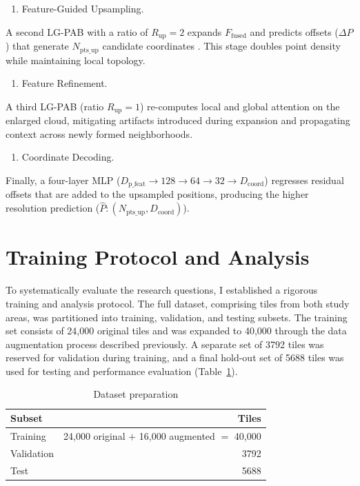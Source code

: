 \documentclass[12pt]{report}
\begin{document}
\begin{enumerate}
\item[(4)] {Feature-Guided Upsampling.}
\end{enumerate}

A second LG-PAB with a ratio of $R_{\text{up}}=2$ expands $F_{\text{fused}}$ and predicts offsets ($\Delta P$) that generate $N_{\text{pts\_up}}$ candidate coordinates
. This stage doubles point density while maintaining local topology.

\begin{enumerate}
\item[(5)] {Feature Refinement.}
\end{enumerate}

A third LG-PAB (ratio $R_{\text{up}}=1$) re-computes local and global attention on the enlarged cloud, mitigating artifacts introduced during expansion and propagating context across newly formed neighborhoods.

\begin{enumerate}
\item[(6)] {Coordinate Decoding.}
\end{enumerate}

Finally, a four-layer MLP ($D_{\text{p\_feat}} \rightarrow 128 \rightarrow 64 \rightarrow 32 \rightarrow D_{\text{coord}}$) regresses residual offsets that are added to the upsampled positions, producing the higher resolution prediction ($\hat{P}: (N_{\text{pts\_up}}, D_{\text{coord}})$).

\section{Training Protocol and Analysis}
\label{sec:study_design}
To systematically evaluate the research questions, I established a rigorous training and analysis protocol. The full dataset, comprising tiles from both study areas, was partitioned into training, validation, and testing subsets. The training set consists of 24,000 original tiles and was expanded to 40,000 through the data augmentation process described previously. A separate set of 3792 tiles was reserved for validation during training, and a final hold-out set of 5688 tiles was used for testing and performance evaluation \mbox{(Table \ref{tab:data_prep})}.
\begin{table}[htbp]
  \centering
  \caption{Dataset preparation}
  \label{tab:data_prep}
  \begin{tabular}{lr}
    \toprule
    \textbf{Subset} & \textbf{Tiles} \\
    \midrule
    Training        & 24,000 original $+$ 16,000 augmented $=$ 40,000 \\
    Validation      & 3792 \\
    Test            & 5688 \\
    \bottomrule
  \end{tabular}
\end{table}
\end{document}
